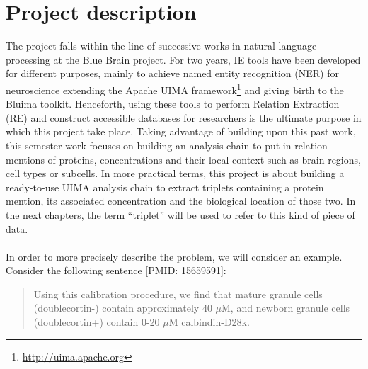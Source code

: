 \documentclass{report}
\begin{document}
		\section{Project description}
		\label{sec:project_desc}
		The project falls within the line of successive works in natural language processing
		at the Blue Brain project. For two years, IE tools have been developed for different 
		purposes, mainly to achieve named entity recognition (NER) for neuroscience extending the Apache 
		UIMA framework\footnote{\url{http://uima.apache.org}} and giving birth to the Bluima 
		toolkit. Henceforth, using these
		tools to perform Relation Extraction (RE) and construct accessible databases for 
		researchers is the ultimate purpose in which this project take place. 
		Taking advantage of building upon this past work, this semester work focuses on building an analysis chain
		to put in relation mentions of proteins, concentrations and their local context such
		as brain regions, cell types or subcells. In more practical terms, this project is about
		building a ready-to-use UIMA analysis chain to extract triplets containing a protein
		mention, its associated concentration and the biological location of those two. In the next
		chapters, the term ``triplet'' will be used to refer to this kind of piece of data.
		
		\paragraph{}In order to more precisely describe the problem, we will
		consider an example. Consider the following sentence [PMID: 15659591]:
		
		\begin{quotation}
		Using this calibration procedure, we find that mature granule cells (doublecortin-) contain approximately 40 $\mu$M, and newborn granule cells (doublecortin+) contain 0-20 $\mu$M calbindin-D28k. 
		\end{quotation}
		
\end{document}
